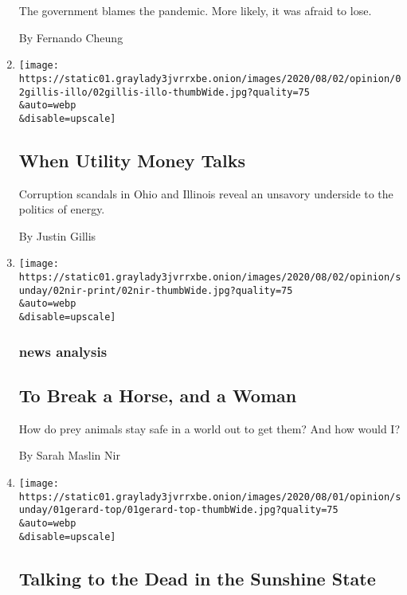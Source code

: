 \begin{enumerate}
  The government blames the pandemic. More likely, it was afraid to
  lose.

  By Fernando Cheung
\item
  \href{/2020/08/02/opinion/utility-corruption-energy.html}{}

  \texttt{[image: https://static01.graylady3jvrrxbe.onion/images/2020/08/02/opinion/02gillis-illo/02gillis-illo-thumbWide.jpg?quality=75\\\&auto=webp\\\&disable=upscale]}

  \hypertarget{when-utility-money-talks}{%
  \subsection{When Utility Money Talks}\label{when-utility-money-talks}}

  Corruption scandals in Ohio and Illinois reveal an unsavory underside
  to the politics of energy.

  By Justin Gillis
\item
  \href{/2020/08/02/sunday-review/horse-crazy-nir-language.html}{}

  \texttt{[image: https://static01.graylady3jvrrxbe.onion/images/2020/08/02/opinion/sunday/02nir-print/02nir-thumbWide.jpg?quality=75\\\&auto=webp\\\&disable=upscale]}

  \hypertarget{news-analysis}{%
  \subsubsection{news analysis}\label{news-analysis}}

  \hypertarget{to-break-a-horse-and-a-woman}{%
  \subsection{To Break a Horse, and a
  Woman}\label{to-break-a-horse-and-a-woman}}

  How do prey animals stay safe in a world out to get them? And how
  would I?

  By Sarah Maslin Nir
\item
  \href{/2020/08/01/opinion/spiritualism-cassadaga-florida.html}{}

  \texttt{[image: https://static01.graylady3jvrrxbe.onion/images/2020/08/01/opinion/sunday/01gerard-top/01gerard-top-thumbWide.jpg?quality=75\\\&auto=webp\\\&disable=upscale]}

  \hypertarget{talking-to-the-dead-in-the-sunshine-state}{%
  \subsection{Talking to the Dead in the Sunshine
  State}\label{talking-to-the-dead-in-the-sunshine-state}}


\end{enumerate}

